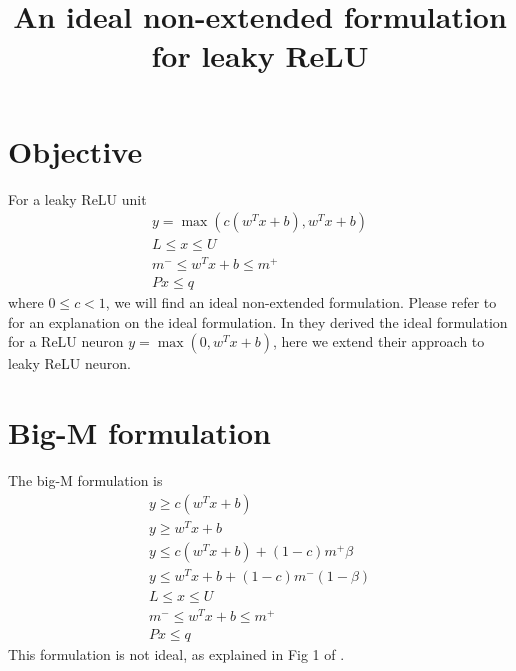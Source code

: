 \documentclass{article}
\title{An ideal non-extended formulation for leaky ReLU}
\begin{document}
\maketitle
\section{Objective}
For a leaky ReLU unit
\begin{subequations}
\begin{align}
	y = \max(c(w^Tx+b), w^Tx+b)\\
	L \le x \le U\\
	m^- \le w^Tx + b \le m^+\\
	Px \le q
\end{align}
\end{subequations}
where $0\le c < 1$, we will find an ideal non-extended formulation. Please refer to \cite{Anderson2020} for an explanation on the ideal formulation. In \cite{Anderson2020} they derived the ideal formulation for a ReLU neuron $y = \max(0, w^Tx+b)$, here we extend their approach to leaky ReLU neuron.

\section{Big-M formulation}
The big-M formulation is
\begin{subequations}
\begin{align}
	y \ge c(w^Tx+b)\\
	y \ge w^Tx+b\\
    y \le c(w^Tx+b) + (1-c)m^+\beta\\
    y \le w^Tx+b + (1-c)m^-(1-\beta)\\
    L \le x \le U\\
m^- \le w^Tx + b \le m^+\\
Px \le q
\end{align}
\end{subequations}
This formulation is not ideal, as explained in Fig 1 of \cite{Anderson2020}.
\end{document}
